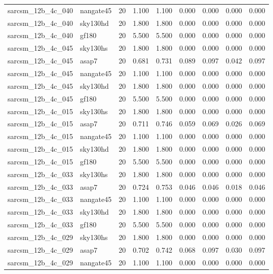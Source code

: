 \begin{tabular}{llrrrrrrr}
sarcsm\_12b\_4c\_040 & nangate45 & 20 & 1.100 & 1.100 & 0.000 & 0.000 & 0.000 & 0.000 \\
sarcsm\_12b\_4c\_040 & sky130hd & 20 & 1.800 & 1.800 & 0.000 & 0.000 & 0.000 & 0.000 \\
sarcsm\_12b\_4c\_040 & gf180 & 20 & 5.500 & 5.500 & 0.000 & 0.000 & 0.000 & 0.000 \\
sarcsm\_12b\_4c\_045 & sky130hs & 20 & 1.800 & 1.800 & 0.000 & 0.000 & 0.000 & 0.000 \\
sarcsm\_12b\_4c\_045 & asap7 & 20 & 0.681 & 0.731 & 0.089 & 0.097 & 0.042 & 0.097 \\
sarcsm\_12b\_4c\_045 & nangate45 & 20 & 1.100 & 1.100 & 0.000 & 0.000 & 0.000 & 0.000 \\
sarcsm\_12b\_4c\_045 & sky130hd & 20 & 1.800 & 1.800 & 0.000 & 0.000 & 0.000 & 0.000 \\
sarcsm\_12b\_4c\_045 & gf180 & 20 & 5.500 & 5.500 & 0.000 & 0.000 & 0.000 & 0.000 \\
sarcsm\_12b\_4c\_015 & sky130hs & 20 & 1.800 & 1.800 & 0.000 & 0.000 & 0.000 & 0.000 \\
sarcsm\_12b\_4c\_015 & asap7 & 20 & 0.711 & 0.746 & 0.059 & 0.069 & 0.026 & 0.069 \\
sarcsm\_12b\_4c\_015 & nangate45 & 20 & 1.100 & 1.100 & 0.000 & 0.000 & 0.000 & 0.000 \\
sarcsm\_12b\_4c\_015 & sky130hd & 20 & 1.800 & 1.800 & 0.000 & 0.000 & 0.000 & 0.000 \\
sarcsm\_12b\_4c\_015 & gf180 & 20 & 5.500 & 5.500 & 0.000 & 0.000 & 0.000 & 0.000 \\
sarcsm\_12b\_4c\_033 & sky130hs & 20 & 1.800 & 1.800 & 0.000 & 0.000 & 0.000 & 0.000 \\
sarcsm\_12b\_4c\_033 & asap7 & 20 & 0.724 & 0.753 & 0.046 & 0.046 & 0.018 & 0.046 \\
sarcsm\_12b\_4c\_033 & nangate45 & 20 & 1.100 & 1.100 & 0.000 & 0.000 & 0.000 & 0.000 \\
sarcsm\_12b\_4c\_033 & sky130hd & 20 & 1.800 & 1.800 & 0.000 & 0.000 & 0.000 & 0.000 \\
sarcsm\_12b\_4c\_033 & gf180 & 20 & 5.500 & 5.500 & 0.000 & 0.000 & 0.000 & 0.000 \\
sarcsm\_12b\_4c\_029 & sky130hs & 20 & 1.800 & 1.800 & 0.000 & 0.000 & 0.000 & 0.000 \\
sarcsm\_12b\_4c\_029 & asap7 & 20 & 0.702 & 0.742 & 0.068 & 0.097 & 0.030 & 0.097 \\
sarcsm\_12b\_4c\_029 & nangate45 & 20 & 1.100 & 1.100 & 0.000 & 0.000 & 0.000 & 0.000 \\

\end{tabular}
